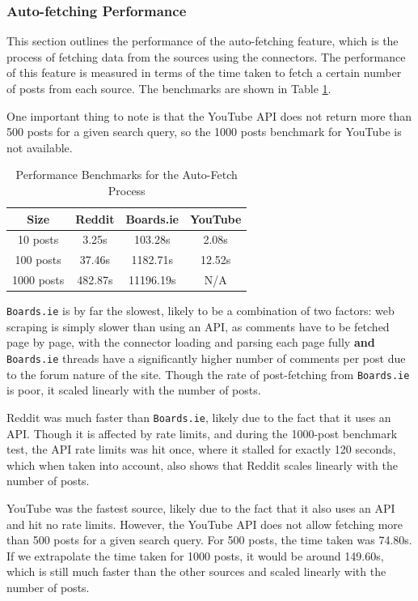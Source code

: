 \documentclass[12pt, a4paper]{article}
\begin{document}
\subsubsection{Auto-fetching Performance}
This section outlines the performance of the auto-fetching feature, which is the process of fetching data from the sources using the connectors. The performance of this feature is measured in terms of the time taken to fetch a certain number of posts from each source. The benchmarks are shown in Table \ref{tab:performance_benchmarks}.

One important thing to note is that the YouTube API does not return more than 500 posts for a given search query, so the 1000 posts benchmark for YouTube is not available.

\begin{table}[!h]
    \centering
    \begin{tabular}{|c|c|c|c|}
        \hline
        \textbf{Size} & \textbf{Reddit} & \textbf{Boards.ie} & \textbf{YouTube} \\
        \hline
        10 posts & 3.25s & 103.28s & 2.08s \\
        100 posts & 37.46s & 1182.71s & 12.52s \\
        1000 posts & 482.87s & 11196.19s & N/A \\
        \hline
    \end{tabular}
    \caption{Performance Benchmarks for the Auto-Fetch Process}
    \label{tab:performance_benchmarks}
\end{table}

\texttt{Boards.ie} is by far the slowest, likely to be a combination of two factors: web scraping is simply slower than using an API, as comments have to be fetched page by page, with the connector loading and parsing each page fully \textbf{and} \texttt{Boards.ie} threads have a significantly higher number of comments per post due to the forum nature of the site. Though the rate of post-fetching from \texttt{Boards.ie} is poor, it scaled linearly with the number of posts.

Reddit was much faster than \texttt{Boards.ie}, likely due to the fact that it uses an API. Though it is affected by rate limits, and during the 1000-post benchmark test, the API rate limits was hit once, where it stalled for exactly 120 seconds, which when taken into account, also shows that Reddit scales linearly with the number of posts.

YouTube was the fastest source, likely due to the fact that it also uses an API and hit no rate limits. However, the YouTube API does not allow fetching more than 500 posts for a given search query. For 500 posts, the time taken was 74.80s. If we extrapolate the time taken for 1000 posts, it would be around 149.60s, which is still much faster than the other sources and scaled linearly with the number of posts.
\end{document}
